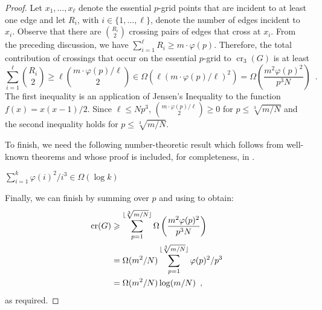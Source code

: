 \documentclass[12pt]{article}
\newcommand{\n}{N}
\DeclareMathOperator{\crs}{cr}
\begin{document}
\begin{proof}
  Let $x_1,\ldots,x_\ell$ denote the essential $p$-grid points that are
  incident to at least one edge and let $R_i$, with $i\in\{1,\ldots,\ell\}$,
  denote the number of edges incident to $x_i$.  Observe that
  there are $\binom{R_i}{2}$ crossing pairs of edges that cross at
  $x_i$.  From the preceding discussion, we have $\sum_{i=1}^\ell R_i
  \ge m\cdot\varphi(p)$.  Therefore, the total contribution of crossings that
  occur on the essential $p$-grid to $\crs_3(G)$ is at least
  \[
      \sum_{i=1}^\ell\binom{R_i}{2} \ge \ell \binom{m\cdot\varphi(p)/\ell}{2}
      \in \Omega(\ell (m\cdot\varphi(p)/\ell)^2)
      = \Omega\left(\frac{m^2\varphi(p)^2}{p^3N}\right) \enspace . 
  \]
  The first inequality is an application of Jensen's Inequality
  to the function $f(x)=x(x-1)/2$.  Since $\ell\le \n p^3$,
  $\binom{m\cdot\varphi(p)/\ell}{2}\ge 0$ for $p\le \sqrt[3]{m/\n}$
  and the second inequality holds
   for $p\le \sqrt[3]{m/\n}$.

  To finish, we need the following number-theoretic result which follows
  from well-known theorems and whose proof is included, for completeness,
  in .
  \begin{clm}
     $\sum_{i=1}^k \varphi(i)^2/i^3\in\Omega(\log k)$
  \end{clm}
  
  Finally, we can finish by summing over $p$ and using 
  to obtain:
  \begin{align*}
     \crs(G) 
       & \ge \sum_{p=1}^{\lfloor\sqrt[3]{m/\n}\rfloor} 
                \Omega\left(\frac{m^2\varphi(p)^2}{p^3N}\right) \notag \\
       & = \Omega(m^2/\n)\sum_{p=1}^{\lfloor\sqrt[3]{m/\n}\rfloor} 
                 \varphi(p)^2/p^3 \\
             & = \Omega(m^2/\n)\log(m/\n) \enspace ,
  \end{align*}
  as required.
\end{proof}
\end{document}
